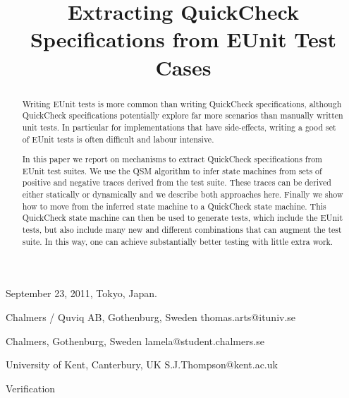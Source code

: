 \documentclass[]{sigplanconf}
\begin{document}
 {September 23, 2011, Tokyo, Japan.}

\title{Extracting QuickCheck Specifications from EUnit Test Cases}

                {Chalmers / Quviq AB, Gothenburg, Sweden}
                {thomas.arts@ituniv.se}

                {Chalmers, Gothenburg, Sweden}
                {lamela@student.chalmers.se}

                {University of Kent, Canterbury, UK}
                {S.J.Thompson@kent.ac.uk}



\maketitle

\begin{abstract}
Writing EUnit tests is more common than writing QuickCheck specifications, although QuickCheck specifications potentially explore far more scenarios than manually written unit tests. 
In particular for implementations that have side-effects, writing a good set of EUnit tests is often difficult and labour intensive.

In this paper we report on mechanisms to extract QuickCheck specifications from EUnit test suites. We use the QSM algorithm to infer state machines from sets of positive and negative traces derived from the test suite. These traces can be derived either statically or dynamically and we describe both approaches here. Finally we show how to move from the inferred state machine to a QuickCheck state machine. This QuickCheck state machine can then be used to generate tests, which include the EUnit tests, but also include many new and different combinations that can augment the test suite. In this way, one can achieve substantially better testing with little extra work.
\end{abstract}




\terms
Verification

\end{document}

